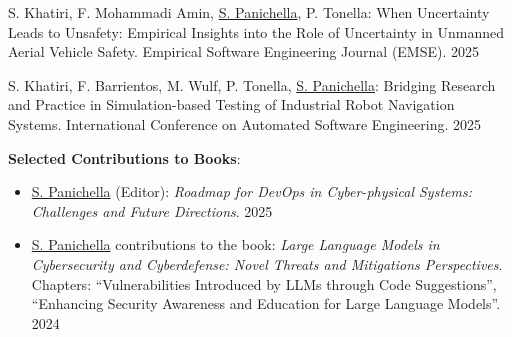 \documentclass[10pt]{article}
\begin{document}
\begin{enumerate}
{\item S. Khatiri, F. Mohammadi Amin, \underline{S. Panichella}, P. Tonella: 
When Uncertainty Leads to Unsafety: Empirical Insights into the Role of Uncertainty in Unmanned Aerial Vehicle Safety. 
Empirical Software Engineering Journal (EMSE). 2025

\item S. Khatiri, F. Barrientos, M. Wulf, P. Tonella, \underline{S. Panichella}: 
Bridging Research and Practice in Simulation-based Testing of Industrial Robot Navigation Systems. 
International Conference on Automated Software Engineering. 2025

\item \textbf{Selected Contributions to Books}:
  \begin{itemize}
    \item \underline{S. Panichella} (Editor): \textit{Roadmap for DevOps in Cyber-physical Systems: Challenges and Future Directions}. 2025
    \item \underline{S. Panichella} contributions to the book: \textit{Large Language Models in Cybersecurity and Cyberdefense: Novel Threats and Mitigations Perspectives}. 
    Chapters: ``Vulnerabilities Introduced by LLMs through Code Suggestions'', 
    ``Enhancing Security Awareness and Education for Large Language Models''. 2024
  \end{itemize}
}
\vspace{-2mm}
\end{enumerate}
\end{document}
